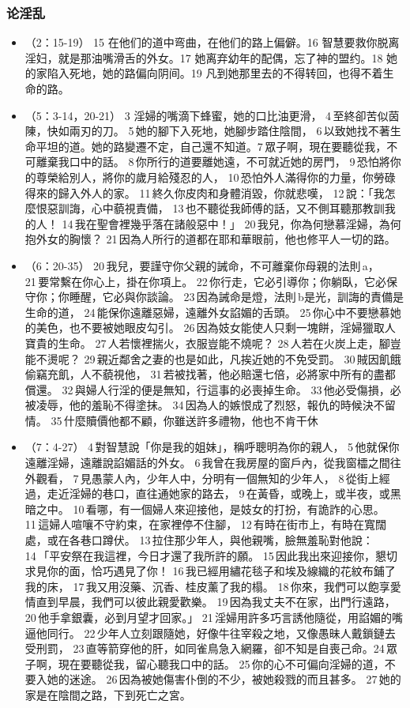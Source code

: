 \subsubsection{论淫乱}
\begin{itemize}
\itemsep-.45em 
\item （2：15-19） 15 在他们的道中弯曲，在他们的路上偏僻。16 智慧要救你脱离淫妇，就是那油嘴滑舌的外女。17 她离弃幼年的配偶，忘了神的盟约。18 她的家陷入死地，她的路偏向阴间。19 凡到她那里去的不得转回，也得不着生命的路。
\item （5：3-14，20-21） 3 淫婦的嘴滴下蜂蜜，她的口比油更滑， 4 至終卻苦似茵陳，快如兩刃的刀。 5 她的腳下入死地，她腳步踏住陰間， 6 以致她找不著生命平坦的道。她的路變遷不定，自己還不知道。7 眾子啊，現在要聽從我，不可離棄我口中的話。 8 你所行的道要離她遠，不可就近她的房門， 9 恐怕將你的尊榮給別人，將你的歲月給殘忍的人， 10 恐怕外人滿得你的力量，你勞碌得來的歸入外人的家。 11 終久你皮肉和身體消毀，你就悲嘆， 12 說：「我怎麼恨惡訓誨，心中藐視責備， 13 也不聽從我師傅的話，又不側耳聽那教訓我的人！ 14 我在聖會裡幾乎落在諸般惡中！」 20 我兒，你為何戀慕淫婦，為何抱外女的胸懷？ 21 因為人所行的道都在耶和華眼前，他也修平人一切的路。
\item （6：20-35） 20 我兒，要謹守你父親的誡命，不可離棄你母親的法則 a， 21 要常繫在你心上，掛在你項上。 22 你行走，它必引導你；你躺臥，它必保守你；你睡醒，它必與你談論。 23 因為誡命是燈，法則 b是光，訓誨的責備是生命的道， 24 能保你遠離惡婦，遠離外女諂媚的舌頭。 25 你心中不要戀慕她的美色，也不要被她眼皮勾引。 26 因為妓女能使人只剩一塊餅，淫婦獵取人寶貴的生命。 27 人若懷裡揣火，衣服豈能不燒呢？ 28 人若在火炭上走，腳豈能不燙呢？ 29 親近鄰舍之妻的也是如此，凡挨近她的不免受罰。 30 賊因飢餓偷竊充飢，人不藐視他， 31 若被找著，他必賠還七倍，必將家中所有的盡都償還。 32 與婦人行淫的便是無知，行這事的必喪掉生命。 33 他必受傷損，必被凌辱，他的羞恥不得塗抹。 34 因為人的嫉恨成了烈怒，報仇的時候決不留情。 35 什麼贖價他都不顧，你雖送許多禮物，他也不肯干休
\item （7：4-27） 4 對智慧說「你是我的姐妹」，稱呼聰明為你的親人， 5 他就保你遠離淫婦，遠離說諂媚話的外女。 6 我曾在我房屋的窗戶內，從我窗櫺之間往外觀看， 7 見愚蒙人內，少年人中，分明有一個無知的少年人， 8 從街上經過，走近淫婦的巷口，直往通她家的路去， 9 在黃昏，或晚上，或半夜，或黑暗之中。 10 看哪，有一個婦人來迎接他，是妓女的打扮，有詭詐的心思。 11 這婦人喧嚷不守約束，在家裡停不住腳， 12 有時在街市上，有時在寬闊處，或在各巷口蹲伏。 13 拉住那少年人，與他親嘴，臉無羞恥對他說： 14 「平安祭在我這裡，今日才還了我所許的願。 15 因此我出來迎接你，懇切求見你的面，恰巧遇見了你！ 16 我已經用繡花毯子和埃及線織的花紋布鋪了我的床， 17 我又用沒藥、沉香、桂皮薰了我的榻。 18 你來，我們可以飽享愛情直到早晨，我們可以彼此親愛歡樂。 19 因為我丈夫不在家，出門行遠路， 20 他手拿銀囊，必到月望才回家。」 21 淫婦用許多巧言誘他隨從，用諂媚的嘴逼他同行。 22 少年人立刻跟隨她，好像牛往宰殺之地，又像愚昧人戴鎖鏈去受刑罰， 23 直等箭穿他的肝，如同雀鳥急入網羅，卻不知是自喪己命。24 眾子啊，現在要聽從我，留心聽我口中的話。 25 你的心不可偏向淫婦的道，不要入她的迷途。 26 因為被她傷害仆倒的不少，被她殺戮的而且甚多。 27 她的家是在陰間之路，下到死亡之宮。

\end{itemize}

